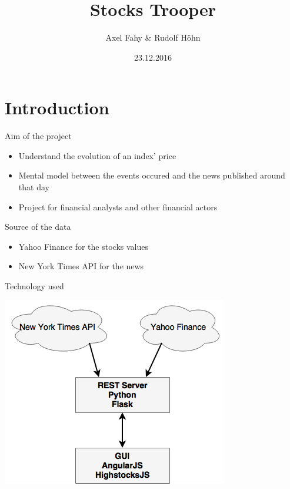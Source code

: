 \documentclass{beamer}
\title{Stocks Trooper}
\author{Axel Fahy \& Rudolf Höhn}
\institute{Information Visualization\\MSE\\\href{https://github.com/rudy2707/Stockstrooper}{GitHub repository}}
\date{23.12.2016}
\begin{document}

\begin{frame}
\titlepage
\end{frame}


%


\section{Introduction}

\begin{frame}{Aim of the project}
    \begin{itemize}
        \item Understand the evolution of an index' price
        \item Mental model between the events occured and the news published around that day
        \item Project for financial analysts and other financial actors
    \end{itemize}
\end{frame}


\begin{frame}{Source of the data}
    \begin{itemize}
        \item Yahoo Finance for the stocks values
        \item New York Times API for the news
    \end{itemize}
\end{frame}


\begin{frame}{Technology used}
    \begin{center}
        \includegraphics[scale=0.5]{Figures/st-system-architecture.png}
    \end{center}
\end{frame}
\end{document}
